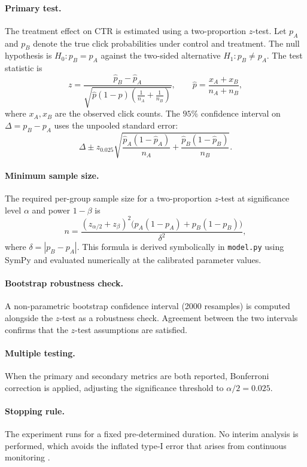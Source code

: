\documentclass[a4paper,12pt]{extarticle}
\numberwithin{equation}{section}
\begin{document}
\paragraph{Primary test.} The treatment effect on CTR is
estimated using a two-proportion $z$-test. Let $p_A$ and $p_B$
denote the true click probabilities under control and treatment.
The null hypothesis is $H_0: p_B = p_A$ against the two-sided
alternative $H_1: p_B \neq p_A$. The test statistic is
\[
    z = \frac{\hat{p}_B - \hat{p}_A}{\sqrt{
        \hat{p}(1-\hat{p})\!\left(\frac{1}{n_A}+\frac{1}{n_B}
        \right)}},
    \qquad
    \hat{p} = \frac{x_A + x_B}{n_A + n_B},
\]
where $x_A, x_B$ are the observed click counts. The $95\%$
confidence interval on $\Delta = p_B - p_A$ uses the unpooled
standard error:
\[
    \Delta \pm z_{0.025}
    \sqrt{\frac{\hat{p}_A(1-\hat{p}_A)}{n_A} +
          \frac{\hat{p}_B(1-\hat{p}_B)}{n_B}}.
\]

\paragraph{Minimum sample size.} The required per-group sample
size for a two-proportion $z$-test at significance level
$\alpha$ and power $1-\beta$ is
\[
    n = \frac{(z_{\alpha/2} + z_{\beta})^2
        \bigl(p_A(1-p_A) + p_B(1-p_B)\bigr)}{\delta^2},
\]
where $\delta = |p_B - p_A|$. This formula is derived
symbolically in \texttt{model.py} using SymPy and evaluated
numerically at the calibrated parameter values.

\paragraph{Bootstrap robustness check.} A non-parametric
bootstrap confidence interval (2000 resamples) is computed
alongside the $z$-test as a robustness check. Agreement between
the two intervals confirms that the $z$-test assumptions are
satisfied.

\paragraph{Multiple testing.} When the primary and secondary
metrics are both reported, Bonferroni correction is applied,
adjusting the significance threshold to $\alpha/2 = 0.025$.

\paragraph{Stopping rule.} The experiment runs for a fixed
pre-determined duration. No interim analysis is performed, which
avoids the inflated type-I error that arises from continuous
monitoring \cite{johari2017peeking}.
\end{document}
